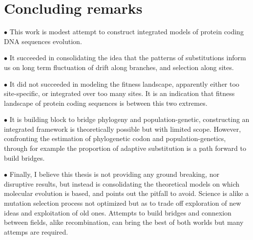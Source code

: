 \section{Concluding remarks}
\label{sec:concluding-remarks}

$\bullet$ This work is modest attempt to construct integrated models of protein coding \acrshort{DNA} sequences evolution.

$\bullet$ It succeeded in consolidating the idea that the patterns of \glspl{substitution} inform us on long term fluctuation of drift along branches, and selection along sites.

$\bullet$ It did not succeeded in modeling the fitness landscape, apparently either too site-specific, or integrated over too many sites.
It is an indication that fitness landscape of protein coding sequences is between this two extremes.

$\bullet$ It is building block to bridge phylogeny and population-genetic, constructing an integrated framework is theoretically possible but with limited scope.
However, confronting the estimation of phylogenetic \gls{codon} and population-genetics, through for example the proportion of adaptive \gls{substitution} is a path forward to build bridges.

$\bullet$ Finally, I believe this thesis is not providing any ground breaking, nor disruptive results, but instead is consolidating the theoretical models on which molecular evolution is based, and points out the pitfall to avoid.
Science is alike a mutation selection process not optimized but as to trade off exploration of new ideas and exploitation of old ones.
Attempts to build bridges and connexion between fields, alike \gls{recombination}, can bring the best of both worlds but many attemps are required.